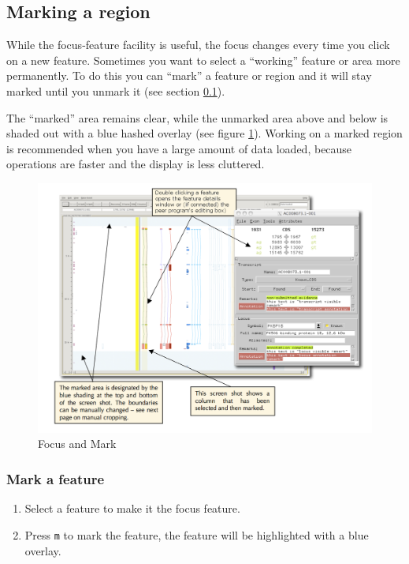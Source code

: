 \documentclass[letterpaper]{article}
\begin{document}
\subsection{Marking a region} \label{section_marking_a_region}
While the focus-feature facility is useful, the focus changes every time you click on a new feature. Sometimes you want to select a ``working'' feature or area more permanently. To do this you can ``mark'' a feature or region and it will stay marked until you unmark it (see section \ref{section_marking_a_region}).
 
The ``marked'' area remains clear, while the unmarked area above and below is shaded out with a blue hashed overlay (see figure \ref{img_focus_and_mark}). Working on a marked region is recommended when you have a large amount of data loaded, because operations are faster and the display is less cluttered.

\begin{figure}
\centering
\color[rgb]{0.30980393,0.5058824,0.7411765}
\includegraphics[width=15.231cm]{images/focus_and_mark.png}
\caption{Focus and Mark}
\label{img_focus_and_mark}
\end{figure}

\subsubsection{Mark a feature}
\begin{enumerate}
\item Select a feature to make it the focus feature.
\item Press \lstinline{m} to mark the feature, the feature will be highlighted with a blue overlay.
\end{enumerate}
\end{document}
